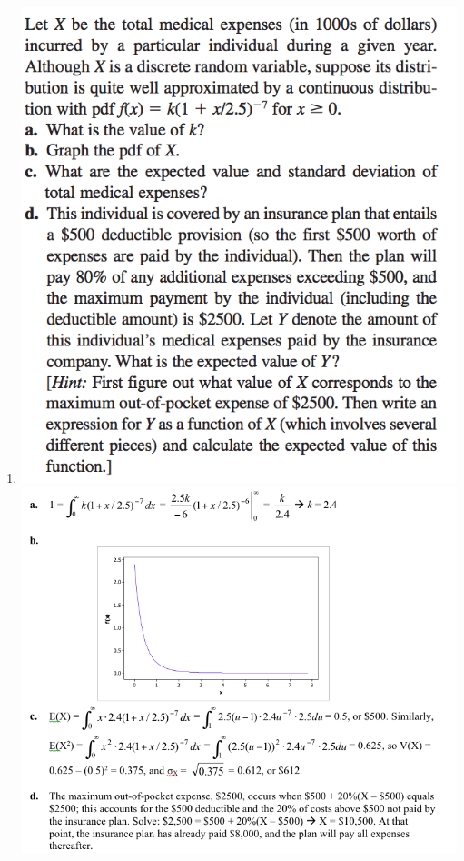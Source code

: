 \documentclass{article}\usepackage{graphicx, color}
\numberwithin{equation}{section}
\begin{document}
\begin{flushleft}
\begin{enumerate}[1. ]
\item 
{} \includegraphics{../../fig/h6p2.png}
 \includegraphics{../../fig/h6p2sol.png}


\end{enumerate}
\end{flushleft}
\end{document}
